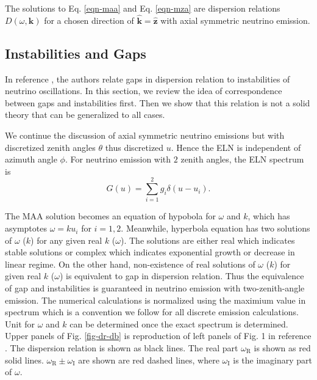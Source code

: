 The solutions to Eq. \eqref{eqn-maa} and Eq. \eqref{eqn-mza} are dispersion relations $D(\omega,\mathbf k)$ for a chosen direction of $\hat{\mathbf k} = \hat{\mathbf z}$ with axial symmetric neutrino emission.









\subsection{\label{chap:collective-sec:fast-mode-subsec:instabilities-and-gaps}Instabilities and Gaps}

In reference \cite{Izaguirre2016a}, the authors relate gaps in dispersion relation to instabilities of neutrino oscillations. In this section, we review the idea of correspondence between gaps and instabilities first. Then we show that this relation is not a solid theory that can be generalized to all cases.

We continue the discussion of axial symmetric neutrino emissions but with discretized zenith angles $\theta$ thus discretized $u$. Hence the ELN is independent of azimuth angle $\phi$. For neutrino emission with $2$ zenith angles, the ELN spectrum is
\begin{equation}
G(u)= \sum_{i=1}^2 g_i \delta(u - u_i).
\end{equation}

The MAA solution becomes an equation of hypobola for $\omega$ and $k$, which has asymptotes $\omega = k u_i$ for $i=1,2$. Meanwhile, hyperbola equation has two solutions of $\omega$ ($k$) for any given real $k$ ($\omega$). The solutions are either real which indicates stable solutions or complex which indicates exponential growth or decrease in linear regime. On the other hand, non-existence of real solutions of $\omega$ ($k$) for given real $k$ ($\omega$) is equivalent to gap in dispersion relation. Thus the equivalence of gap and instabilities is guaranteed in neutrino emission with two-zenith-angle emission. The numerical calculations is normalized using the maximium value in spectrum which is a convention we follow for all discrete emission calculations. Unit for $\omega$ and $k$ can be determined once the exact spectrum is determined. Upper panels of Fig. \ref{fig-dr-db} is reproduction of left panels of Fig. 1 in reference \cite{Izaguirre2016a}. The dispersion relation is shown as black lines. The real part $\omega_{\mathrm R}$ is shown as red solid lines. $\omega_{\mathrm R} \pm \omega_{\mathrm I}$ are shown are red dashed lines, where $\omega_{\mathrm I}$ is the imaginary part of $\omega$.



